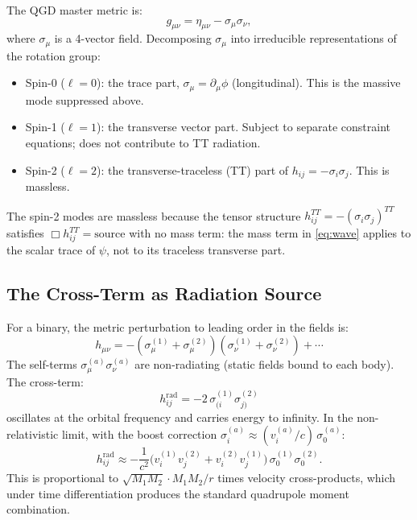 \documentclass[12pt,a4paper]{article}
\begin{document}
The QGD master metric is:
\begin{equation}
  g_{\mu\nu} = \eta_{\mu\nu} - \sigma_\mu\sigma_\nu,
\end{equation}
where $\sigma_\mu$ is a 4-vector field. Decomposing $\sigma_\mu$ into
irreducible representations of the rotation group:
\begin{itemize}[noitemsep]
  \item Spin-0 ($\ell=0$): the trace part, $\sigma_\mu = \partial_\mu\phi$
    (longitudinal). This is the massive mode suppressed above.
  \item Spin-1 ($\ell=1$): the transverse vector part. Subject to separate
    constraint equations; does not contribute to TT radiation.
  \item Spin-2 ($\ell=2$): the transverse-traceless (TT) part of
    $h_{ij} = -\sigma_i\sigma_j$. This is massless.
\end{itemize}

The spin-2 modes are massless because the tensor structure
$h_{ij}^{TT} = -(\sigma_i\sigma_j)^{TT}$
satisfies $\Box h_{ij}^{TT} = \mathrm{source}$ with no mass term:
the mass term in \eqref{eq:wave} applies to the scalar trace of $\psi$,
not to its traceless transverse part.

\subsection{The Cross-Term as Radiation Source}

For a binary, the metric perturbation to leading order in the
fields is:
\begin{equation}
  h_{\mu\nu} = -(\sigma_\mu^{(1)}+\sigma_\mu^{(2)})
               (\sigma_\nu^{(1)}+\sigma_\nu^{(2)}) + \cdots
\end{equation}
The self-terms $\sigma_\mu^{(a)}\sigma_\nu^{(a)}$ are non-radiating
(static fields bound to each body). The cross-term:
\begin{equation}
  h_{ij}^{\mathrm{rad}} = -2\,\sigma_{(i}^{(1)}\sigma_{j)}^{(2)}
\end{equation}
oscillates at the orbital frequency and carries energy to infinity.
In the non-relativistic limit, with the boost correction
$\sigma_i^{(a)} \approx (v_i^{(a)}/c)\,\sigma_0^{(a)}$:
\begin{equation}
  h_{ij}^{\mathrm{rad}} \approx
    -\frac{1}{c^2}
    \bigl(v_i^{(1)}v_j^{(2)} + v_i^{(2)}v_j^{(1)}\bigr)\,
    \sigma_0^{(1)}\sigma_0^{(2)}.
  \label{eq:hrad}
\end{equation}
This is proportional to $\sqrt{M_1M_2}\cdot M_1M_2/r$ times velocity
cross-products, which under time differentiation produces the standard
quadrupole moment combination.
\end{document}
